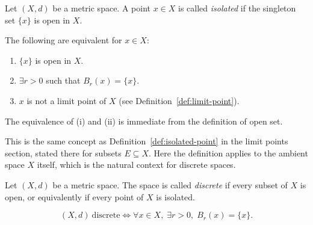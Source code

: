 \begin{tcolorbox}[colback=propbox, colframe=propborder, arc=2pt,
  left=6pt, right=6pt, top=4pt, bottom=4pt,
  title={\small\textbf{Definition (Isolated Point)}},
  fonttitle=\small\bfseries]
\begin{definition}
\label{def:isolated-point-ms}
Let $(X,d)$ be a metric space.
A point $x \in X$ is called \emph{isolated} if the singleton set $\{x\}$
is open in $X$.
\end{definition}
\end{tcolorbox}

\begin{remark*}
The following are equivalent for $x \in X$:
\begin{enumerate}[label=(\roman*)]
  \item $\{x\}$ is open in $X$.
  \item $\exists r > 0$ such that $B_r(x) = \{x\}$.
  \item $x$ is not a limit point of $X$
        (see Definition~\ref{def:limit-point}).
\end{enumerate}
The equivalence of (i) and (ii) is immediate from the definition of open set.
\end{remark*}

\begin{remark*}
This is the same concept as Definition~\ref{def:isolated-point} in the
limit points section, stated there for subsets $E \subseteq X$.
Here the definition applies to the ambient space $X$ itself,
which is the natural context for discrete spaces.
\end{remark*}

\begin{tcolorbox}[colback=propbox, colframe=propborder, arc=2pt,
  left=6pt, right=6pt, top=4pt, bottom=4pt,
  title={\small\textbf{Definition (Discrete Metric Space)}},
  fonttitle=\small\bfseries]
\begin{definition}
\label{def:discrete-metric-space}
Let $(X,d)$ be a metric space.
The space is called \emph{discrete} if every subset of $X$ is open,
or equivalently if every point of $X$ is isolated.
\end{definition}
\end{tcolorbox}

\begin{remark*}
\[
(X,d)\ \text{discrete}
\iff
\forall x \in X,\;
\exists r > 0,\;
B_r(x) = \{x\}.
\]
\end{remark*}

